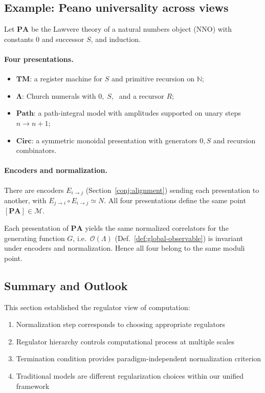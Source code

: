\subsection{Example: Peano universality across views}
\label{subsec:peano-moduli}
Let $\mathbf{PA}$ be the Lawvere theory of a natural numbers object (NNO)
with constants $0$ and successor $S$, and induction.

\paragraph{Four presentations.}
\begin{itemize}
\item $\mathbf{TM}$: a register machine for $S$ and primitive recursion on $\mathbb{N}$;
\item $\mathbf{\Lambda}$: Church numerals with $0,\;S,\;$ and a recursor $R$;
\item $\mathbf{Path}$: a path-integral model with amplitudes supported on unary steps $n\to n+1$;
\item $\mathbf{Circ}$: a symmetric monoidal presentation with generators $0,S$ and recursion combinators.
\end{itemize}

\paragraph{Encoders and normalization.}
There are encoders $E_{i\to j}$ (Section~\ref{conj:alignment}) sending each presentation to another,
with $E_{j\to i}\circ E_{i\to j}\simeq N$.
All four presentations define the same point $[\mathbf{PA}]\in\mathcal{M}$.

\begin{proposition}
Each presentation of $\mathbf{PA}$ yields the same normalized correlators for
the generating function $G$, i.e.\ $\mathcal{O}(\Lambda)$ (Def.~\ref{def:global-observable})
is invariant under encoders and normalization. Hence all four belong to the same moduli point.
\end{proposition}

\subsection{Summary and Outlook}

This section established the regulator view of computation:

\begin{enumerate}
\item Normalization step corresponds to choosing appropriate regulators
\item Regulator hierarchy controls computational process at multiple scales
\item Termination condition provides paradigm-independent normalization criterion
\item Traditional models are different regularization choices within our unified framework
\end{enumerate}

